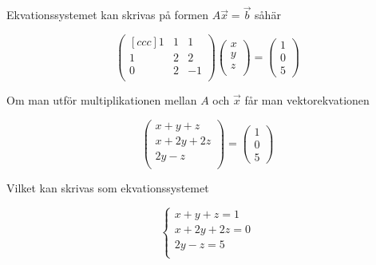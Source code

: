 \documentclass[../../main.tex]{subfiles}
\begin{document}
\begin{solution}{4} 

Ekvationssystemet kan skrivas på formen $A\Vec{x}=\Vec{b}$ såhär

$$
\begin{pmatrix}[ccc]
1 & 1 & 1\\
1 & 2 & 2\\
0 & 2 & -1\\ 
\end{pmatrix}\begin{pmatrix}
x\\
y\\
z\\
\end{pmatrix} = \begin{pmatrix}
1\\
0\\
5
\end{pmatrix}
$$

Om man utför multiplikationen mellan $A$ och $\Vec{x}$ får man vektorekvationen

$$\begin{pmatrix}
x + y + z\\
x + 2y + 2z\\
2y - z\\
\end{pmatrix}=\begin{pmatrix}
1\\0\\5
\end{pmatrix}$$

Vilket kan skrivas som ekvationssystemet

$$
\begin{cases}
x + y + z = 1\\
x + 2y + 2z = 0\\
2y - z = 5\\
\end{cases}
$$
\end{solution}
\end{document}
